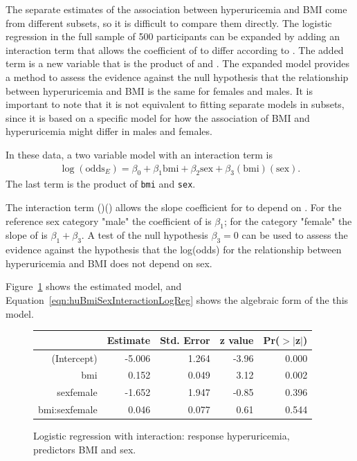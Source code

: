 The separate estimates of the association between hyperuricemia and BMI come from different subsets, so it is difficult to compare them directly. The logistic regression in the full sample of 500 participants can be expanded by adding an interaction term that allows the coefficient of  to differ according to . The added term is a new variable that is the product of  and . The expanded model provides a method to assess the evidence against the null hypothesis that the relationship between hyperuricemia and BMI is the same for females and males.  It is important to note that it is not equivalent to fitting separate models in subsets, since it is based on a specific model for how the association of BMI and hyperuricemia might differ in males and females.

In these data, a two variable model with an interaction term is
\begin{align}
  \log(\text{odds}_E) = \beta_0 + \beta_1 \text{bmi}
       + \beta_2 \text{sex} + \beta_3 (\text{bmi})(\text{sex}).
       \label{eqn:huBmiSexInteraction}
\end{align}
The last term is the product of \texttt{bmi} and \texttt{sex}.

The interaction term ()() allows the slope coefficient for  to depend on .  For the reference sex category "male" the coefficient of  is $\beta_1$; for the category "female" the slope of  is $\beta_1 + \beta_3$.  A test of the null hypothesis $\beta_3 = 0$ can be used to assess the evidence against the hypothesis that the log(odds) for the relationship between hyperuricemia and BMI does not depend on sex.

Figure~\ref{figure:huBmiSexInteractionLogReg} shows the estimated model, and Equation~\ref{eqn:huBmiSexInteractionLogReg} shows the algebraic form of the this model.

\begin{figure}[ht]
\centering
\begin{tabular}{rrrrr}
  \hline
 & Estimate & Std. Error & z value & Pr($>$$|$z$|$) \\
  \hline
(Intercept) & -5.006 & 1.264 & -3.96 & 0.000 \\
  bmi & 0.152 & 0.049 & 3.12 & 0.002 \\
  sexfemale & -1.652 & 1.947 & -0.85 & 0.396 \\
  bmi:sexfemale & 0.046 & 0.077 & 0.61 & 0.544 \\
   \hline
\end{tabular}
\caption{Logistic regression with interaction: response hyperuricemia,
        predictors BMI and sex.}
\label{figure:huBmiSexInteractionLogReg}
\end{figure}


